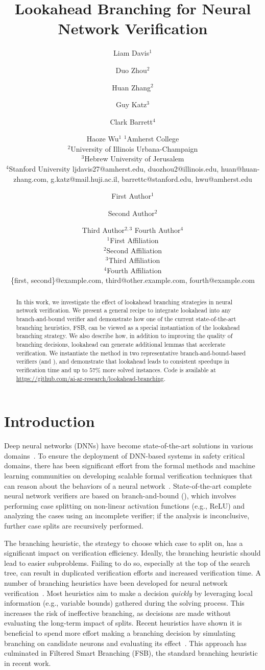 \documentclass{article}
\title{Lookahead Branching for Neural Network Verification}
\author{
    Liam Davis$^1$ \and
    Duo Zhou$^2$ \and
    Huan Zhang$^2$ \and
    Guy Katz$^3$ \and
    Clark Barrett$^4$ \and
    Haoze Wu$^1$
    \affiliations
    $^1$Amherst College \\
    $^2$University of Illinois Urbana-Champaign \\
    $^3$Hebrew University of Jerusalem \\
    $^4$Stanford University
    \emails
    ljdavis27@amherst.edu,
    duozhou2@illinois.edu,
    huan@huan-zhang.com,
    g.katz@mail.huji.ac.il,
    barrettc@stanford.edu,
    hwu@amherst.edu
}
\author{
First Author$^1$
\and
Second Author$^2$\and
Third Author$^{2,3}$\And
Fourth Author$^4$\\
\affiliations
$^1$First Affiliation\\
$^2$Second Affiliation\\
$^3$Third Affiliation\\
$^4$Fourth Affiliation\\
\emails
\{first, second\}@example.com,
third@other.example.com,
fourth@example.com
}
\begin{document}
\maketitle

\begin{abstract}
In this work, we investigate the effect of lookahead branching strategies in neural network verification. We present a general recipe to integrate lookahead into any branch-and-bound verifier and demonstrate how one of the current state-of-the-art branching heuristics, FSB, can be viewed as a special instantiation of the lookahead branching strategy. We also describe how, in addition to improving the quality of branching decisions, lookahead can generate additional lemmas that accelerate verification. We instantiate the method in two representative branch-and-bound-based verifiers (\marabou and \abcrown), and demonstrate that lookahead leads to consistent speedups in verification time and up to $57\%$ more solved instances. Code is available at \url{https://github.com/ai-ar-research/lookahead-branching}.
\end{abstract}

\section{Introduction}

Deep neural networks (DNNs) have become state-of-the-art solutions in various domains~\cite{sallab2017deep,mnih2013playing,he2015delving}. To ensure the deployment of DNN-based systems in safety critical domains, there has been significant effort from the formal methods and machine learning communities on developing scalable formal verification techniques that can reason about the behaviors of a neural network~\cite{katz2017reluplex,singh2019abstract,zhang2018efficient,wang2021beta}. State-of-the-art complete neural network verifiers are based on branch-and-bound (\bab), which involves performing case splitting on non-linear activation functions (e.g., ReLU) and analyzing the cases using an incomplete verifier; if the analysis is inconclusive, further case splits are recursively performed. 

The branching heuristic, the strategy to choose which case to split on, has a significant impact on verification efficiency. Ideally, the branching heuristic should lead to easier subproblems. Failing to do so, especially at the top of the search tree, can result in duplicated verification efforts and increased verification time. A number of branching heuristics have been developed for neural network verification~\cite{katz2017reluplex,wu2020parallelization,bunel2020branch,de2021scaling,wu2022efficient}. Most heuristics aim to make a decision \emph{quickly} by leveraging local information (e.g., variable bounds) gathered during the solving process. This increases the risk of ineffective branching, as decisions are made without evaluating the long-term impact of splits. Recent heuristics have shown it is beneficial to spend more effort making a branching decision by simulating branching on candidate neurons and evaluating its effect~\cite{de2021scaling}. This approach has culminated in Filtered Smart Branching (FSB), the standard branching heuristic in recent work.
\end{document}
